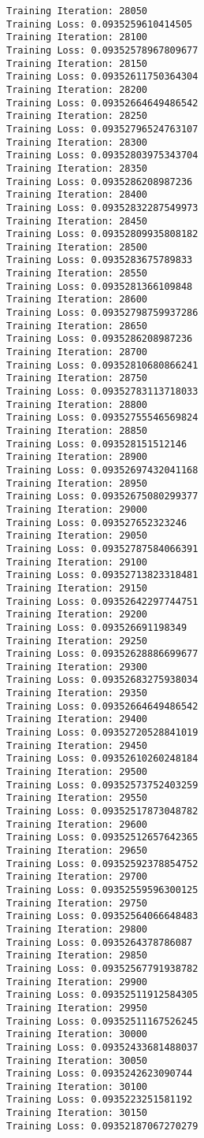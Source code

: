 \documentclass[11pt]{article}
\begin{document}
\begin{Verbatim}[commandchars=\\\{\}]
Training Iteration: 28050
Training Loss: 0.0935259610414505
Training Iteration: 28100
Training Loss: 0.09352578967809677
Training Iteration: 28150
Training Loss: 0.09352611750364304
Training Iteration: 28200
Training Loss: 0.09352664649486542
Training Iteration: 28250
Training Loss: 0.09352796524763107
Training Iteration: 28300
Training Loss: 0.09352803975343704
Training Iteration: 28350
Training Loss: 0.0935286208987236
Training Iteration: 28400
Training Loss: 0.09352832287549973
Training Iteration: 28450
Training Loss: 0.09352809935808182
Training Iteration: 28500
Training Loss: 0.0935283675789833
Training Iteration: 28550
Training Loss: 0.0935281366109848
Training Iteration: 28600
Training Loss: 0.09352798759937286
Training Iteration: 28650
Training Loss: 0.0935286208987236
Training Iteration: 28700
Training Loss: 0.09352810680866241
Training Iteration: 28750
Training Loss: 0.09352783113718033
Training Iteration: 28800
Training Loss: 0.09352755546569824
Training Iteration: 28850
Training Loss: 0.093528151512146
Training Iteration: 28900
Training Loss: 0.09352697432041168
Training Iteration: 28950
Training Loss: 0.09352675080299377
Training Iteration: 29000
Training Loss: 0.093527652323246
Training Iteration: 29050
Training Loss: 0.09352787584066391
Training Iteration: 29100
Training Loss: 0.09352713823318481
Training Iteration: 29150
Training Loss: 0.09352642297744751
Training Iteration: 29200
Training Loss: 0.093526691198349
Training Iteration: 29250
Training Loss: 0.09352628886699677
Training Iteration: 29300
Training Loss: 0.09352683275938034
Training Iteration: 29350
Training Loss: 0.09352664649486542
Training Iteration: 29400
Training Loss: 0.09352720528841019
Training Iteration: 29450
Training Loss: 0.09352610260248184
Training Iteration: 29500
Training Loss: 0.09352573752403259
Training Iteration: 29550
Training Loss: 0.09352517873048782
Training Iteration: 29600
Training Loss: 0.09352512657642365
Training Iteration: 29650
Training Loss: 0.09352592378854752
Training Iteration: 29700
Training Loss: 0.09352559596300125
Training Iteration: 29750
Training Loss: 0.09352564066648483
Training Iteration: 29800
Training Loss: 0.0935264378786087
Training Iteration: 29850
Training Loss: 0.09352567791938782
Training Iteration: 29900
Training Loss: 0.09352511912584305
Training Iteration: 29950
Training Loss: 0.09352511167526245
Training Iteration: 30000
Training Loss: 0.09352433681488037
Training Iteration: 30050
Training Loss: 0.0935242623090744
Training Iteration: 30100
Training Loss: 0.0935223251581192
Training Iteration: 30150
Training Loss: 0.09352187067270279

\end{Verbatim}
\end{document}
